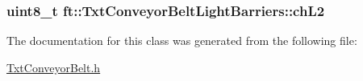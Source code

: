 \subsubsection[{\texorpdfstring{ch\+L2}{chL2}}]{\setlength{\rightskip}{0pt plus 5cm}uint8\+\_\+t ft\+::\+Txt\+Conveyor\+Belt\+Light\+Barriers\+::ch\+L2\hspace{0.3cm}{\ttfamily [protected]}}\hypertarget{classft_1_1_txt_conveyor_belt_light_barriers_af9383c0faa8024f9b50d38dd9938a6ac}{}\label{classft_1_1_txt_conveyor_belt_light_barriers_af9383c0faa8024f9b50d38dd9938a6ac}


The documentation for this class was generated from the following file\+:\begin{DoxyCompactItemize}
\item 
\hyperlink{_txt_conveyor_belt_8h}{Txt\+Conveyor\+Belt.\+h}\end{DoxyCompactItemize}
